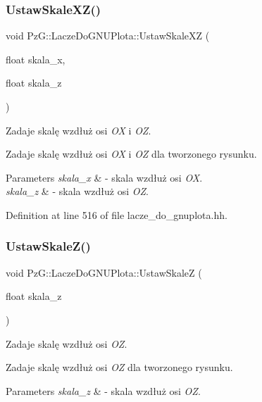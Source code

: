 \subsubsection{\texorpdfstring{Ustaw\+Skale\+X\+Z()}{UstawSkaleXZ()}}
{\footnotesize\ttfamily void Pz\+G\+::\+Lacze\+Do\+G\+N\+U\+Plota\+::\+Ustaw\+Skale\+XZ (\begin{DoxyParamCaption}\item[{float}]{skala\+\_\+x,  }\item[{float}]{skala\+\_\+z }\end{DoxyParamCaption})\hspace{0.3cm}{\ttfamily [inline]}}



Zadaje skalę wzdłuż osi {\itshape OX} i {\itshape OZ}. 

Zadaje skalę wzdłuż osi {\itshape OX} i {\itshape OZ} dla tworzonego rysunku. 
\begin{DoxyParams}{Parameters}
{\em skala\+\_\+x} & -\/ skala wzdłuż osi {\itshape OX}. \\
\hline
{\em skala\+\_\+z} & -\/ skala wzdłuż osi {\itshape OZ}. \\
\hline
\end{DoxyParams}


Definition at line 516 of file lacze\+\_\+do\+\_\+gnuplota.\+hh.

\mbox{\label{class_pz_g_1_1_lacze_do_g_n_u_plota_ab0486db3166d8db6580a221079af241f}} 
\subsubsection{\texorpdfstring{Ustaw\+Skale\+Z()}{UstawSkaleZ()}}
{\footnotesize\ttfamily void Pz\+G\+::\+Lacze\+Do\+G\+N\+U\+Plota\+::\+Ustaw\+SkaleZ (\begin{DoxyParamCaption}\item[{float}]{skala\+\_\+z }\end{DoxyParamCaption})\hspace{0.3cm}{\ttfamily [inline]}}



Zadaje skalę wzdłuż osi {\itshape OZ}. 

Zadaje skalę wzdłuż osi {\itshape OZ} dla tworzonego rysunku. 
\begin{DoxyParams}{Parameters}
{\em skala\+\_\+z} & -\/ skala wzdłuż osi {\itshape OZ}. \\
\hline
\end{DoxyParams}



